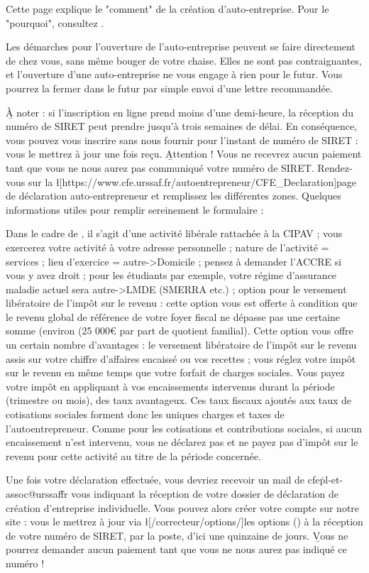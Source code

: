 ﻿Cette page explique le "comment" de la création d'auto-entreprise. Pour le "pourquoi", consultez .

Les démarches pour l'ouverture de l'auto-entreprise peuvent se faire directement de chez vous, sans même bouger de votre chaise.
Elles ne sont pas contraignantes, et l'ouverture d'une auto-entreprise ne vous engage à rien pour le futur. Vous pourrez la fermer dans le futur par simple envoi d'une lettre recommandée.

\b{À noter} : si l'inscription en ligne prend moins d'une demi-heure, la réception du numéro de SIRET peut prendre jusqu'à trois semaines de délai. En conséquence, vous pouvez vous inscrire sans nous fournir pour l'instant de numéro de SIRET : vous le mettrez à jour une fois reçu. \b{Attention !} Vous ne recevrez aucun paiement tant que vous ne nous aurez pas communiqué votre numéro de SIRET.
Rendez-vous sur la \l[https://www.cfe.urssaf.fr/autoentrepreneur/CFE_Declaration]{page de déclaration auto-entrepreneur} et remplissez les différentes zones. Quelques informations utiles pour remplir sereinement le formulaire :
\begin{itemize}
	\li Dans le cadre de \eDevoir, il s'agit d'une activité libérale rattachée à la CIPAV ;
	\li vous exercerez votre activité à votre adresse personnelle ;
	\li nature de l'activité = services ; lieu d'exercice = autre->Domicile ;
	\li pensez à demander l'ACCRE si vous y avez droit ;
	\li pour les étudiants par exemple, votre régime d'assurance maladie actuel sera autre->LMDE (SMERRA etc.) ;
	\li option pour le versement libératoire de l'impôt sur le revenu : cette option vous est offerte à condition que le revenu global de
référence de votre foyer fiscal ne dépasse pas une certaine somme (environ (25 000€ par part de quotient familial). Cette option vous offre un certain nombre d’avantages : le versement libératoire de l’impôt sur le revenu assis sur votre chiffre d’affaires encaissé ou vos recettes ; vous réglez votre impôt sur le revenu en même temps que votre forfait de charges sociales. Vous payez votre impôt en appliquant à vos encaissements intervenus durant la période (trimestre ou mois), des taux avantageux. Ces taux fiscaux ajoutés aux taux de cotisations sociales forment donc les uniques charges et taxes de l’autoentrepreneur. Comme pour les cotisations et contributions sociales, si aucun encaissement n’est intervenu, vous ne déclarez pas et ne payez pas d’impôt sur le revenu pour cette activité au titre de la période concernée.
\end{itemize}

Une fois votre déclaration effectuée, vous devriez recevoir un mail de cfe\.pl-et-assoc@urssaf\.fr vous indiquant la réception de votre dossier de déclaration de création d'entreprise individuelle.
Vous pouvez alors créer votre compte sur notre site : vous le mettrez à jour via \l[/correcteur/options/]{les options} () à la réception de votre numéro de SIRET, par la poste, d'ici une quinzaine de jours. \b{Vous ne pourrez demander aucun paiement tant que vous ne nous aurez pas indiqué ce numéro} !